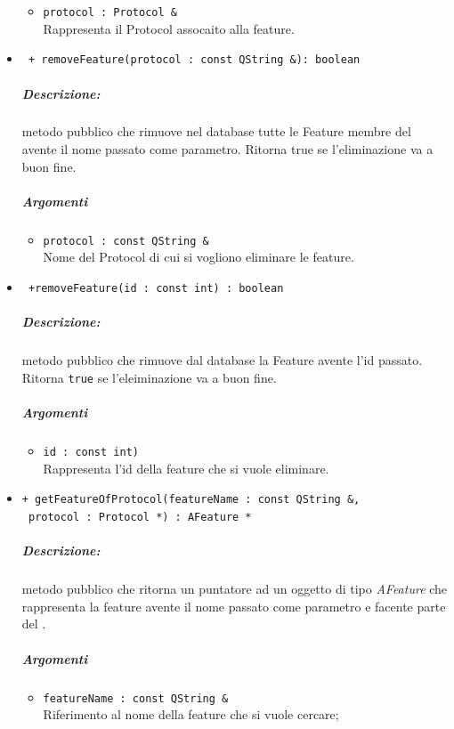 \begin{itemize}
\begin{itemize}
				\item \color{RoyalPurple}\verb!protocol : Protocol &!\\
				\color{black}Rappresenta il Protocol\g{} assocaito alla feature\g{}.
			\end{itemize}
			
		\item \color{blue}\verb! + removeFeature(protocol : const QString &): boolean!\\
		\color{black} 
		\subparagraph{Descrizione:} metodo pubblico che rimuove nel database tutte le Feature\g{} membre del \protocol{} avente il nome passato come parametro. Ritorna true se l'eliminazione va a buon fine.
		\subparagraph{Argomenti}
			\begin{itemize}
				\item \color{RoyalPurple}\verb!protocol : const QString &! \\ 
				\color{black}Nome del Protocol di cui si vogliono eliminare le feature\g{}.
			\end{itemize}
			
		\item \color{blue}\verb! +removeFeature(id : const int) : boolean!\\
		\color{black}
		\subparagraph{Descrizione:} metodo pubblico che rimuove dal database la Feature\g{} avente l'id passato.
		Ritorna \verb!true! se l'eleiminazione va a buon fine.
		\subparagraph{Argomenti}
			\begin{itemize}
				\item \color{RoyalPurple}\verb!id : const int)!\\
				\color{black}Rappresenta l'id della feature\g{} che si vuole eliminare.
			\end{itemize}
			
		\item \color{blue}\verb!+ getFeatureOfProtocol(featureName : const QString &,!\\
									\verb! protocol : Protocol *) : AFeature *!\\
		\color{black} 
		\subparagraph{Descrizione:} metodo pubblico che ritorna un puntatore ad un oggetto di tipo \textsl{AFeature} che rappresenta la feature\g{} avente il nome passato come parametro e facente parte del \protocol{}.
		\subparagraph{Argomenti}
			\begin{itemize}
				\item \color{RoyalPurple}\verb!featureName : const QString &! \\
				\color{black} Riferimento al nome della feature\g{} che si vuole cercare;
				

\end{itemize}
\end{itemize}
